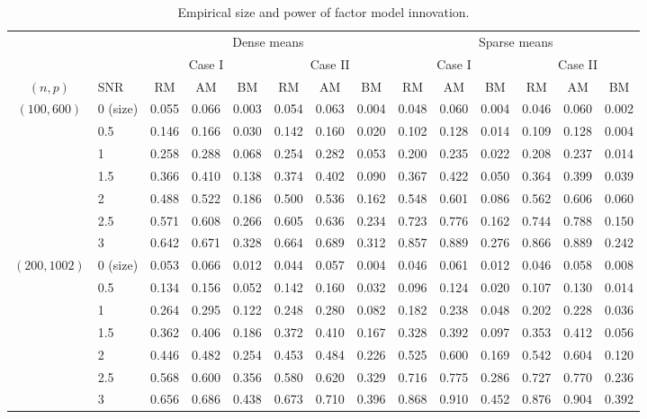 \documentclass[3p]{elsarticle}
\theoremstyle{plain}
\theoremstyle{definition}
\theoremstyle{remark}
\begin{document}
\begin{table}[ht]
    \caption{Empirical size and power of factor model innovation.}
\label{table3}
\footnotesize
    \centering
    \begin{tabular}{clcccccccccccc}
          \toprule
          & & \multicolumn{6}{c}{Dense means} &\multicolumn{6}{c}{Sparse means}\\
          \cmidrule(r){3-8}\cmidrule(r){9-14}
          & & \multicolumn{3}{c}{Case I} & \multicolumn{3}{c}{Case II} & \multicolumn{3}{c}{Case I}& \multicolumn{3}{c}{Case II}\\
          \cmidrule(r){3-5}  \cmidrule(r){6-8} \cmidrule(r){9-11}  \cmidrule(r){12-14}
           $(n,p)$&SNR & RM & AM & BM & RM & AM & BM & RM & AM & BM & RM & AM & BM  \\ 
            \midrule
        $(100,600)$ &0 (size) & 0.055 & 0.066 & 0.003 & 0.054 & 0.063 & 0.004 & 0.048 & 0.060 & 0.004 & 0.046 & 0.060 & 0.002 \\ 
&0.5 & 0.146 & 0.166 & 0.030 & 0.142 & 0.160 & 0.020 & 0.102 & 0.128 & 0.014 & 0.109 & 0.128 & 0.004 \\ 
&1 & 0.258 & 0.288 & 0.068 & 0.254 & 0.282 & 0.053 & 0.200 & 0.235 & 0.022 & 0.208 & 0.237 & 0.014 \\ 
&1.5 & 0.366 & 0.410 & 0.138 & 0.374 & 0.402 & 0.090 & 0.367 & 0.422 & 0.050 & 0.364 & 0.399 & 0.039 \\ 
&2 & 0.488 & 0.522 & 0.186 & 0.500 & 0.536 & 0.162 & 0.548 & 0.601 & 0.086 & 0.562 & 0.606 & 0.060 \\ 
&2.5 & 0.571 & 0.608 & 0.266 & 0.605 & 0.636 & 0.234 & 0.723 & 0.776 & 0.162 & 0.744 & 0.788 & 0.150 \\ 
&3 & 0.642 & 0.671 & 0.328 & 0.664 & 0.689 & 0.312 & 0.857 & 0.889 & 0.276 & 0.866 & 0.889 & 0.242 \\ 
\midrule
        $(200,1002)$&0 (size) & 0.053 & 0.066 & 0.012 & 0.044 & 0.057 & 0.004 & 0.046 & 0.061 & 0.012 & 0.046 & 0.058 & 0.008 \\
&0.5 & 0.134 & 0.156 & 0.052 & 0.142 & 0.160 & 0.032 & 0.096 & 0.124 & 0.020 & 0.107 & 0.130 & 0.014 \\
&1 & 0.264 & 0.295 & 0.122 & 0.248 & 0.280 & 0.082 & 0.182 & 0.238 & 0.048 & 0.202 & 0.228 & 0.036 \\
&1.5 & 0.362 & 0.406 & 0.186 & 0.372 & 0.410 & 0.167 & 0.328 & 0.392 & 0.097 & 0.353 & 0.412 & 0.056 \\
&2 & 0.446 & 0.482 & 0.254 & 0.453 & 0.484 & 0.226 & 0.525 & 0.600 & 0.169 & 0.542 & 0.604 & 0.120 \\
&2.5 & 0.568 & 0.600 & 0.356 & 0.580 & 0.620 & 0.329 & 0.716 & 0.775 & 0.286 & 0.727 & 0.770 & 0.236 \\
&3 & 0.656 & 0.686 & 0.438 & 0.673 & 0.710 & 0.396 & 0.868 & 0.910 & 0.452 & 0.876 & 0.904 & 0.392 \\
        \bottomrule
    \end{tabular}
\end{table}
\end{document}
